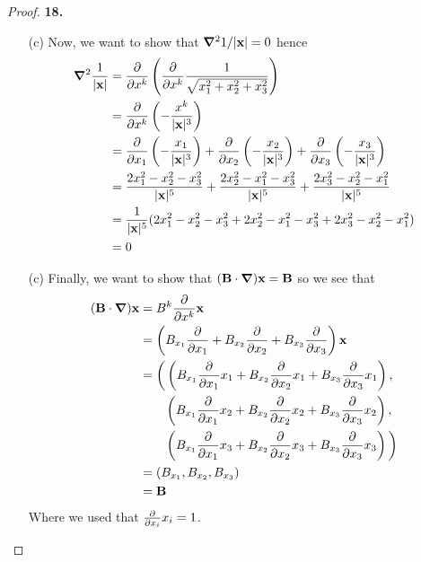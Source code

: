 \documentclass[11pt]{article}
\theoremstyle{definition}
\begin{document}
\begin{proof}{\textbf{18.}}
\begin{itemize}
    \item [(c)] Now, we want to show that
    $\gradient^2 1/|\mathbf{x}| = 0$ hence
    \begin{align*}
        \gradient^2 \frac{1}{|\mathbf{x}|} &=
            \partialderivative{}{x^k}
            \left(\partialderivative{}{x^k}\frac{1}{\sqrt{x_1^2 + x_2^2 + x_3^2}}\right)\\
            &= \partialderivative{}{x^k}
            \left(-\frac{x^k}{|\mathbf{x}|^3}\right)\\
            &= \partialderivative{}{x_1}\left(-\frac{x_1}{|\mathbf{x}|^3}\right)
            + \partialderivative{}{x_2}\left(-\frac{x_2}{|\mathbf{x}|^3}\right)
            + \partialderivative{}{x_3}\left(-\frac{x_3}{|\mathbf{x}|^3}\right)\\
            &= \frac{2x_1^2 - x_2^2 - x_3^2}{|\mathbf{x}|^5}
            + \frac{2x_2^2 - x_1^2 - x_3^2}{|\mathbf{x}|^5}
            + \frac{2x_3^2 - x_2^2 - x_1^2}{|\mathbf{x}|^5}\\
            &= \frac{1}{|\mathbf{x}|^5}
            (2x_1^2- x_2^2 - x_3^2 + 2x_2^2 - x_1^2
            - x_3^2 + 2x_3^2 - x_2^2 - x_1^2)\\
            &= 0
    \end{align*}
    \item [(c)] Finally, we want to show that
    $(\mathbf{B}\cdot\gradient)\mathbf{x} = \mathbf{B}$ so we see that
    \begin{align*}
        (\mathbf{B}\cdot\gradient)\mathbf{x}
            &= B^k\partialderivative{}{x^k} \mathbf{x} \\
            &= \left(B_{x_1}\partialderivative{}{x_1}
            + B_{x_2}\partialderivative{}{x_2}
            + B_{x_3}\partialderivative{}{x_3}\right)\mathbf{x}\\
            &= \bigg(
            \left(B_{x_1}\partialderivative{}{x_1}x_1
            + B_{x_2}\partialderivative{}{x_2}x_1
            + B_{x_3}\partialderivative{}{x_3}x_1\right),\\
            &\qquad\left(B_{x_1}\partialderivative{}{x_1}x_2
            + B_{x_2}\partialderivative{}{x_2}x_2
            + B_{x_3}\partialderivative{}{x_3}x_2\right),\\
            &\qquad\left(B_{x_1}\partialderivative{}{x_1}x_3
            + B_{x_2}\partialderivative{}{x_2}x_3
            + B_{x_3}\partialderivative{}{x_3}x_3\right)
            \bigg)\\
            &= (B_{x_1}, B_{x_2}, B_{x_3})\\
            &= \mathbf{B}
    \end{align*}
    Where we used that $\partialderivative{}{x_i}x_i = 1$.
\end{itemize}
\end{proof}
\end{document}
